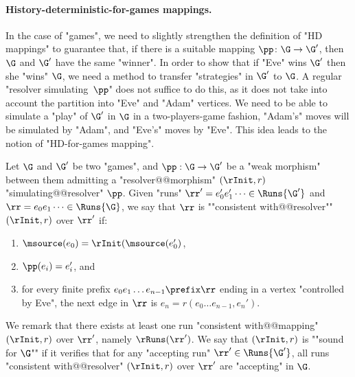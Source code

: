 \documentclass{theoretics}
\begin{document}
\paragraph*{History-deterministic-for-games mappings.}

In the case of "games", we need to slightly strengthen the definition of "HD mappings" to guarantee that, if there is a suitable mapping $\pp\colon\G \to \G'$, then $\G$ and $\G'$ have the same "winner".
In order to show that if "Eve" wins $\G'$ then she "wins" $\G$, we need a method to transfer "strategies" in $\G'$ to $\G$. A regular "resolver simulating~$\pp$" does not suffice to do this, as it does not take into account the partition into "Eve" and "Adam" vertices. 
We need to be able to simulate a "play" of $\G'$ in $\G$ in a two-players-game fashion, "Adam's" moves will be simulated by "Adam", and "Eve's" moves by "Eve". This idea leads to the notion of "HD-for-games mapping".



Let $\G$ and $\G'$ be two "games", and $\pp:\G \to \G'$ be a "weak morphism" between them admitting a "resolver@@morphism" $(\rInit, r)$ "simulating@@resolver" $\pp$. 
\AP Given "runs" $\rr' = e_0'e_1'\dots \in \Runs{\G'}$ and $\rr = e_0e_1\dots \in \Runs{\G}$, we say that $\rr$ is ""consistent with@@resolver"" $(\rInit, r)$ over $\rr'$ if:
\begin{enumerate}
	\item $\msource(e_0) = \rInit(\msource(e_0')$,
	\item $\pp(e_i) = e_i'$, and %
	\item for every finite prefix $e_0e_1\dots e_{n-1} \prefix \rr$ ending in a vertex "controlled by Eve", the next edge in $\rr$ is $e_n = r(e_0\dots e_{n-1}, e_n')$.
\end{enumerate}  
We remark that there exists at least one run "consistent with@@mapping" $(\rInit, r)$ over $\rr'$, namely $\rRuns(\rr')$.
\AP We say that $(\rInit, r)$ is ""sound for $\G$"" if it verifies that for any "accepting run" $\rr'\in \Runs{\G'}$, all runs "consistent with@@resolver" $(\rInit, r)$ over $\rr'$ are "accepting" in $\G$. 
\end{document}

